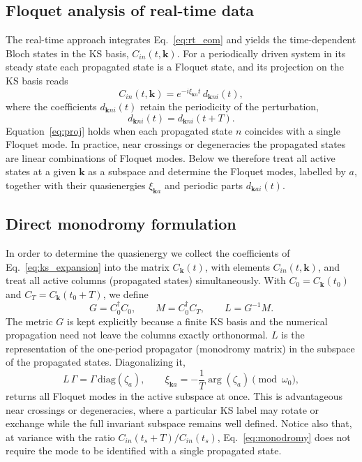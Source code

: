 \documentclass{iopjournal}
\begin{document}
\subsection{Floquet analysis of real-time data}
\label{sec:tool}

The real-time approach integrates Eq.~\ref{eq:rt_eom} and yields the time-dependent Bloch
states in the KS basis, $C_{in}(t,\mathbf k)$. For a periodically driven system in its steady
state each propagated state is a Floquet state, and its projection on the KS basis reads
\begin{equation}
  C_{in}(t,\mathbf k) = e^{-i\xi_{\mathbf k n} t}\, d_{\mathbf k n i}(t),
  \label{eq:proj}
\end{equation}
where the coefficients $d_{\mathbf k n i}(t)$ retain the periodicity of the perturbation,
\begin{equation}
  d_{\mathbf k n i}(t) = d_{\mathbf k n i}(t+T).
  \label{eq:periodicity}
\end{equation}
Equation~\ref{eq:proj} holds when each propagated state $n$ coincides with a single Floquet
mode. In practice, near crossings or degeneracies the propagated states are linear combinations
of Floquet modes. Below we therefore treat all active states at a given $\mathbf k$ as a
subspace and determine the Floquet modes, labelled by $a$, together with their quasienergies
$\xi_{\mathbf k a}$ and periodic parts $d_{\mathbf k a i}(t)$.

\subsection{Direct monodromy formulation}
\label{sec:monodromy}

In order to determine the quasienergy we collect the coefficients of Eq.~\ref{eq:ks_expansion} into the
matrix $C_{\mathbf k}(t)$, with elements $C_{in}(t,\mathbf k)$, and treat all active columns
(propagated states) simultaneously. With $C_0=C_{\mathbf k}(t_0)$ and
$C_T=C_{\mathbf k}(t_0+T)$, we define
\begin{equation}
  G = C_0^\dagger C_0, \qquad M = C_0^\dagger C_T, \qquad L = G^{-1}M .
  \label{eq:monodromy}
\end{equation}
The metric $G$ is kept explicitly because a finite KS basis and the numerical propagation need
not leave the columns exactly orthonormal. $L$ is the representation of the one-period
propagator (monodromy matrix) in the subspace of the propagated states. Diagonalizing it,
\begin{equation}
  L\,\Gamma = \Gamma\,\mathrm{diag}(\zeta_a), \qquad
  \xi_{\mathbf k a} = -\frac{1}{T}\arg(\zeta_a) \pmod{\omega_0},
  \label{eq:quasienergy}
\end{equation}
returns all Floquet modes in the active subspace at once. This is advantageous near crossings
or degeneracies, where a particular KS label may rotate or exchange while the full invariant
subspace remains well defined. Notice also that, at variance with the ratio
$C_{in}(t_s+T)/C_{in}(t_s)$, Eq.~\ref{eq:monodromy} does not require the mode to be
identified with a single propagated state.
\end{document}
